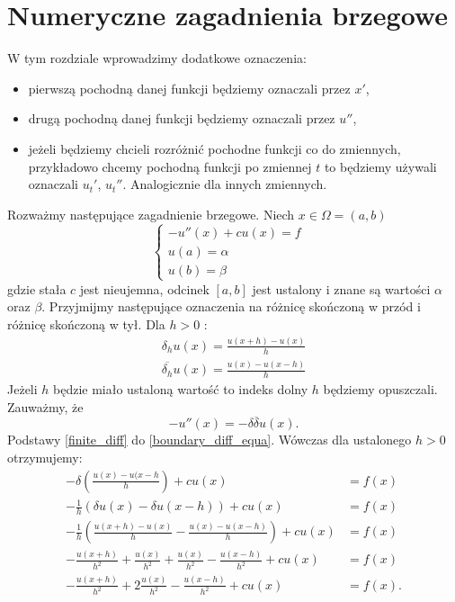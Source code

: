 \documentclass[12pt,a4paper]{report}
\begin{document}
\chapter{Numeryczne zagadnienia brzegowe}
W tym rozdziale wprowadzimy dodatkowe oznaczenia: 
\begin{itemize}
\item pierwszą pochodną danej funkcji będziemy oznaczali przez $x'$,
\item drugą pochodną danej funkcji  będziemy oznaczali przez $u''$,
\item jeżeli będziemy chcieli rozróżnić pochodne funkcji co do zmiennych, przykładowo chcemy pochodną funkcji po zmiennej $t$ to będziemy używali oznaczali $u_t'$, $u_t''$. Analogicznie dla innych zmiennych.
\end{itemize}
Rozważmy następujące zagadnienie brzegowe. Niech $ x \in \Omega = (a,b) $
\begin{equation} \label{boundary_diff_equa}
\left\{ \begin{array}{ll}
-u''(x) + cu(x) =f & \\
u(a) = \alpha & \\
u(b) = \beta & 
\end{array} \right.
\end{equation}
gdzie stała $c$ jest nieujemna, odcinek $ [a,b]$ jest ustalony i znane są wartości $\alpha$ oraz $\beta$. Przyjmijmy następujące oznaczenia na różnicę skończoną w przód i różnicę skończoną w tył. Dla $h>0$ :
\begin{equation} \label{finite_diff}
\begin{array}{c}
\delta_h u(x) = \frac{u(x+h) - u(x)}{h}   \\
\overline{\delta_h} u(x) = \frac{u(x)-u(x-h)}{h}  
\end{array}
\end{equation}
Jeżeli $h$ będzie miało ustaloną wartość to indeks dolny $h$ będziemy opuszczali. Zauważmy, że 
$$
-u''(x) = -\delta \overline{\delta} u(x).
$$
Podstawy \ref{finite_diff} do \ref{boundary_diff_equa}. Wówczas dla ustalonego $h>0$ otrzymujemy: 
\begin{equation}
\begin{array}{rl}
-\delta (\frac{u(x)-u(x-h}{h}) + cu(x) &= f(x)  \\
- \frac{1}{h} (\delta u(x) - \delta u(x-h) ) + cu(x) &= f(x) \\
-\frac{1}{h} (\frac{u(x+h)-u(x)}{h} - \frac{u(x)-u(x-h)}{h}) + cu(x) &= f(x) \\
-\frac{u(x+h)}{h^2} + \frac{u(x)}{h^2} + \frac{u(x)}{h^2} - \frac{u(x-h)}{h^2} +cu(x)& = f(x) \\
-\frac{u(x+h)}{h^2} + 2\frac{u(x)}{h^2} - \frac{u(x-h)}{h^2} +cu(x) &= f(x) .
\end{array}
\end{equation}
\end{document}
